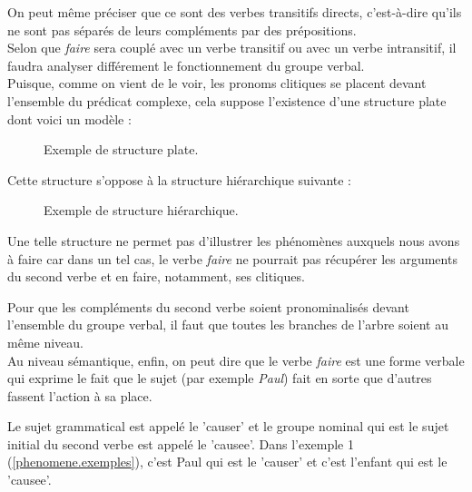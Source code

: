 On peut même préciser que ce sont des verbes transitifs directs, c'est-à-dire qu'ils ne sont pas séparés de leurs compléments par des prépositions.\\

Selon que \emph{faire} sera couplé avec un verbe transitif ou avec un verbe intransitif, il faudra analyser différement le fonctionnement du groupe verbal.\\

Puisque, comme on vient de le voir, les pronoms clitiques se placent devant l'ensemble du prédicat complexe, cela suppose l'existence d'une structure plate dont voici un modèle : \\

\begin{figure}[ht]
\centering
{}
\caption{Exemple de structure plate.}
\end{figure}

Cette structure s'oppose à la structure hiérarchique suivante :\\

\begin{figure}[ht]
\centering
{}
\caption{Exemple de structure hiérarchique.}
\end{figure}


Une telle structure ne permet pas d'illustrer les phénomènes auxquels nous avons à faire car dans un tel cas, le verbe \emph{faire} ne pourrait pas récupérer les arguments du second verbe et en faire, notamment, ses clitiques.

Pour que les compléments du second verbe soient pronominalisés devant l'ensemble du groupe verbal, il faut que toutes les branches de l'arbre soient au même niveau.\\

Au niveau sémantique, enfin, on peut dire que le verbe \emph{faire} est une forme verbale qui exprime le fait que le sujet (par exemple \emph{Paul}) fait en sorte que d'autres fassent l'action à sa place.

Le sujet grammatical est appelé le 'causer' et le groupe nominal qui est le sujet initial du second verbe est appelé le 'causee'.
Dans l'exemple 1 (\autoref{phenomene.exemples}), c'est Paul qui est le 'causer' et c'est l'enfant qui est le 'causee'.

